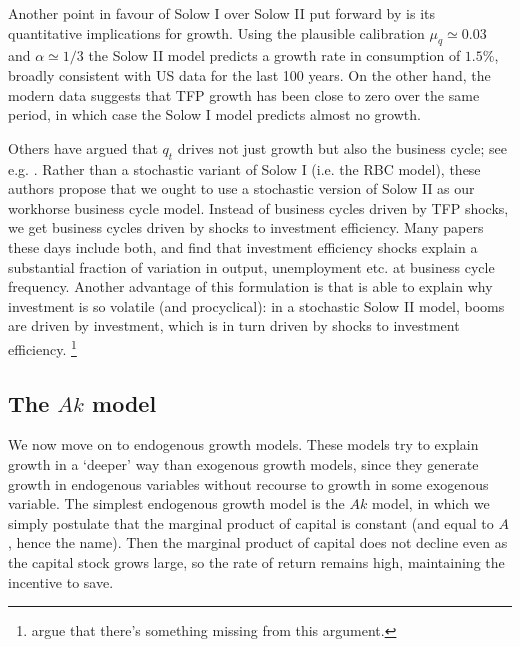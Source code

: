 \documentclass[11pt,letterpaper,reqno,oneside]{article}
\begin{document}
Another point in favour of Solow I over Solow II put forward by \textcite{GreenwoodHercowitzKrusell1997} is its quantitative implications for growth. Using the plausible calibration $\mu_q \simeq 0.03$ and $\alpha \simeq 1/3$ the Solow II model predicts a growth rate in consumption of $1.5\%$, broadly consistent with US data for the last 100 years. On the other hand, the modern data suggests that TFP growth has been close to zero over the same period, in which case the Solow I model predicts almost no growth.

Others have argued that $q_t$ drives not just growth but also the business cycle; see e.g. \textcite{GreenwoodHercowitzKrusell1988}. Rather than a stochastic variant of Solow I (i.e. the RBC model), these authors propose that we ought to use a stochastic version of Solow II as our workhorse business cycle model. Instead of business cycles driven by TFP shocks, we get business cycles driven by shocks to investment efficiency. Many papers these days include both, and find that investment efficiency shocks explain a substantial fraction of variation in output, unemployment etc. at business cycle frequency. Another advantage of this formulation is that is able to explain why investment is so volatile (and procyclical): in a stochastic Solow II model, booms are driven by investment, which is in turn driven by shocks to investment efficiency.%
	\footnote{\textcite{ChristianoMottoRostagno2014} argue that there's something missing from this argument.}



\subsection{The \texorpdfstring{$Ak$}{Ak} model}
\label{sec:28Oct2015:Ak_model}

We now move on to endogenous growth models. These models try to explain growth in a `deeper' way than exogenous growth models, since they generate growth in endogenous variables without recourse to growth in some exogenous variable. The simplest endogenous growth model is the $Ak$ model, in which we simply postulate that the marginal product of capital is constant (and equal to $A$, hence the name). Then the marginal product of capital does not decline even as the capital stock grows large, so the rate of return remains high, maintaining the incentive to save.
\end{document}
